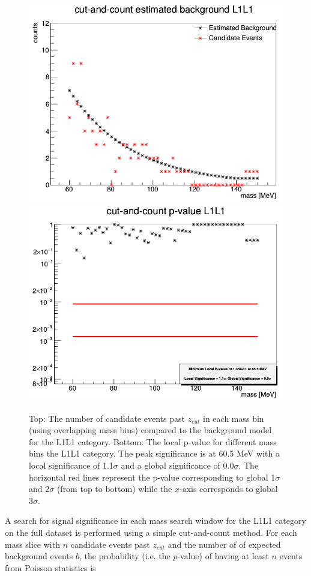 \begin{figure}[t]
    \centering
    \includegraphics[width=.85\textwidth]{figs/Results/cand_L1L1.png}
    \includegraphics[width=.85\textwidth]{figs/Results/pval_L1L1.png}
    \caption{Top:  The number of candidate events past $z_{cut}$ in each mass bin (using overlapping mass bins) compared to the background model for the L1L1 category. Bottom: The local p-value for different mass bins the L1L1 category. The peak significance is at 60.5 MeV with a local significance of 1.1$\sigma$ and a global significance of 0.0$\sigma$. The horizontal red lines represent the p-value corresponding to global 1$\sigma$ and 2$\sigma$ (from top to bottom) while the $x$-axis corresponds to global 3$\sigma$. %
    }
    \label{fig:sig_L1L1}
\end{figure}

A search for signal significance in each mass search window for the L1L1 category on the full dataset is performed using a simple cut-and-count method. For each mass slice with $n$ candidate events past $z_{cut}$ and the number of of expected background events $b$, the probability (i.e. the $p$-value) of having at least $n$ events from Poisson statistics is 

